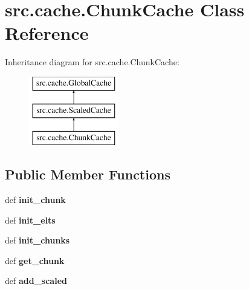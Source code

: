 \hypertarget{classsrc_1_1cache_1_1_chunk_cache}{\section{src.\-cache.\-Chunk\-Cache \-Class \-Reference}
\label{classsrc_1_1cache_1_1_chunk_cache}
}
\-Inheritance diagram for src.\-cache.\-Chunk\-Cache\-:\begin{figure}[H]
\begin{center}
\leavevmode
\includegraphics[height=3.000000cm]{classsrc_1_1cache_1_1_chunk_cache}
\end{center}
\end{figure}
\subsection*{\-Public \-Member \-Functions}
\begin{DoxyCompactItemize}
\item 
\hypertarget{classsrc_1_1cache_1_1_chunk_cache_a0aa8988de1687be4dda3acf4d800f761}{def {\bfseries init\-\_\-chunk}}\label{classsrc_1_1cache_1_1_chunk_cache_a0aa8988de1687be4dda3acf4d800f761}

\item 
\hypertarget{classsrc_1_1cache_1_1_chunk_cache_a27271b01addc34ba6d1025a3b07c2327}{def {\bfseries init\-\_\-elts}}\label{classsrc_1_1cache_1_1_chunk_cache_a27271b01addc34ba6d1025a3b07c2327}

\item 
\hypertarget{classsrc_1_1cache_1_1_chunk_cache_a28d77735ab7945fefc93b72dcc327de5}{def {\bfseries init\-\_\-chunks}}\label{classsrc_1_1cache_1_1_chunk_cache_a28d77735ab7945fefc93b72dcc327de5}

\item 
\hypertarget{classsrc_1_1cache_1_1_chunk_cache_afbc38d0fdb2729303afbe947a0f1c94a}{def {\bfseries get\-\_\-chunk}}\label{classsrc_1_1cache_1_1_chunk_cache_afbc38d0fdb2729303afbe947a0f1c94a}

\item 
\hypertarget{classsrc_1_1cache_1_1_chunk_cache_a8d6829cc375aa5c17b4c88390a02baef}{def {\bfseries add\-\_\-scaled}}\label{classsrc_1_1cache_1_1_chunk_cache_a8d6829cc375aa5c17b4c88390a02baef}

\end{DoxyCompactItemize}
